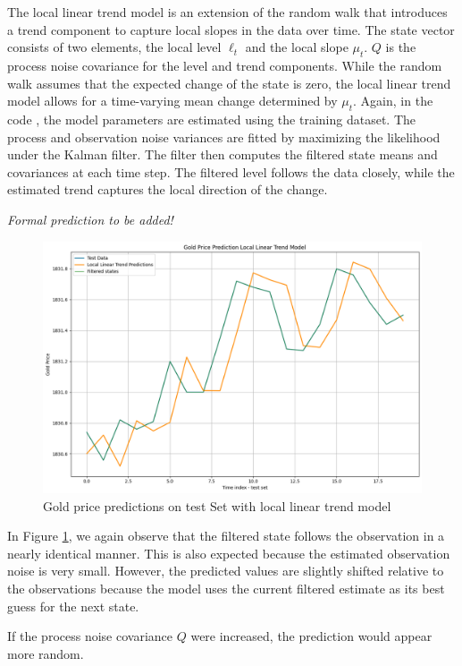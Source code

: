 \medskip
The local linear trend model is an extension of the random walk that introduces a trend component to capture local slopes  in the data over time. The state vector consists of two elements, the local level $\ell_t$ and the local slope $\mu_t$. $Q$ is the process noise covariance for the level and trend components. While the random walk assumes that the expected change of the state is zero, the local linear trend model allows for a time-varying mean change determined by $\mu_t$. Again, in the code , the model parameters are estimated using the training dataset. The process and observation noise variances are fitted by maximizing the likelihood under the Kalman filter. The filter then computes the filtered state means and covariances at each time step. The filtered level follows the data closely, while the estimated trend captures the local direction of the change. 

\medskip
\noindent
\textit{Formal prediction to be added!}


\begin{figure}[H]
    \centering
    \includegraphics[width=0.5\linewidth]{Figures/Gold Price Predictions Local Linear Trend Model.png}
    \caption{Gold price predictions on test Set with local linear trend model}
    \label{fig:loclin}
\end{figure}

In Figure \ref{fig:loclin}, we again observe that the filtered state follows the observation in a nearly identical manner. This is also expected because the estimated observation noise is very small. However, the predicted values are slightly shifted relative to the observations because the model uses the current filtered estimate as its best guess for the next state. 

If the process noise covariance $Q$ were increased, the prediction would appear more random. 




